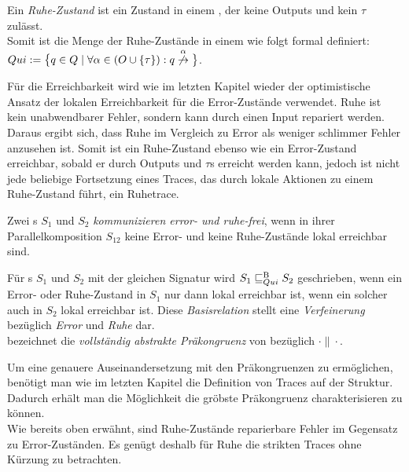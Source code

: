 \begin{Def}[Ruhe]
  Ein \emph{Ruhe-Zustand} ist ein Zustand in einem \EIO{}, der keine
  Outputs und kein $\tau$ zulässt.\\
  Somit ist die Menge der Ruhe-Zustände in einem \EIO{} wie folgt formal
  definiert: $Qui:=\big\{q\in Q\mid \forall \alpha\in (O\cup \{\tau\}): q
  \overset{\alpha}{\not{\hspace{-0.1cm}\rightarrow}}\big\}$.
\end{Def}

Für die Erreichbarkeit wird wie im letzten Kapitel wieder der
optimistische Ansatz der lokalen Erreichbarkeit für die Error-Zustände
verwendet. Ruhe ist kein unabwendbarer Fehler, sondern kann durch einen Input
repariert werden. Daraus ergibt sich, dass Ruhe im Vergleich zu Error als
weniger \glqq{}schlimmer Fehler\grqq{} anzusehen ist. Somit ist ein
Ruhe-Zustand ebenso wie ein Error-Zustand erreichbar, sobald er durch Outputs
und $\tau$s erreicht werden kann, jedoch ist nicht jede beliebige Fortsetzung
eines Traces, das durch lokale Aktionen zu einem Ruhe-Zustand führt, ein
Ruhetrace.

\begin{Def}
  Zwei \EIO{}s $S_1$ und $S_2$ \emph{kommunizieren error- und ruhe-frei}, wenn
  in ihrer Parallelkomposition $S_{12}$ keine Error- und keine Ruhe-Zustände
  lokal erreichbar sind.
\end{Def}

\begin{Def}
\label{DefQuiBasisrel}
  Für \EIO{}s $S_1$ und $S_2$ mit der gleichen Signatur wird
  $S_1\sqsubseteq _{Qui}^\mathrm{B} S_2$ geschrieben, wenn ein Error- oder Ruhe-Zustand in $S_1$ nur
  dann lokal erreichbar ist, wenn ein solcher auch in $S_2$ lokal erreichbar
  ist. Diese \emph{Basisrelation} stellt eine \emph{Verfeinerung} bezüglich
  \emph{Error} und \emph{Ruhe} dar.\\
  \QCRel{} bezeichnet die \emph{vollständig abstrakte Präkongruenz} von
  \QBRel{} bezüglich $\cdot\|\cdot$.
\end{Def}

Um eine genauere Auseinandersetzung mit den Präkongruenzen zu ermöglichen,
benötigt man wie im letzten Kapitel die Definition von Traces auf der Struktur.
Dadurch erhält man die Möglichkeit die gröbste Präkongruenz charakterisieren zu
können.\\
Wie bereits oben erwähnt, sind Ruhe-Zustände reparierbare Fehler im Gegensatz
zu Error-Zuständen. Es genügt deshalb für Ruhe die strikten Traces ohne Kürzung
zu betrachten.

